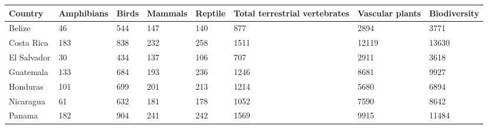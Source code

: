 \documentclass{article}
\begin{document}
\begin{tabular}{llllllll}
\toprule
Country & Amphibians & Birds & Mammals & Reptile & Total terrestrial vertebrates & Vascular plants & Biodiversity \\
\midrule
Belize & 46 & 544 & 147 & 140 & 877 & 2894 & 3771 \\
Costa Rica & 183 & 838 & 232 & 258 & 1511 & 12119 & 13630 \\
El Salvador & 30 & 434 & 137 & 106 & 707 & 2911 & 3618 \\
Guatemala & 133 & 684 & 193 & 236 & 1246 & 8681 & 9927 \\
Honduras & 101 & 699 & 201 & 213 & 1214 & 5680 & 6894 \\
Nicaragua & 61 & 632 & 181 & 178 & 1052 & 7590 & 8642 \\
Panama & 182 & 904 & 241 & 242 & 1569 & 9915 & 11484 \\
\bottomrule
\end{tabular}
\end{document}
